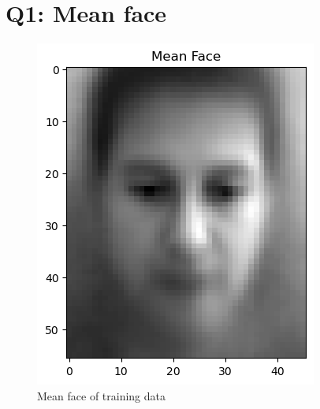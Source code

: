 \section{Q1: Mean face}
\label{subsec:Q1_meanface}
\begin{figure}[htbp]
	\centering
	\includegraphics[width=0.4\linewidth]{image/q1_meanface.png} 
	\caption{Mean face of training data}
	\label{fig:q1_meanface}
\end{figure}

